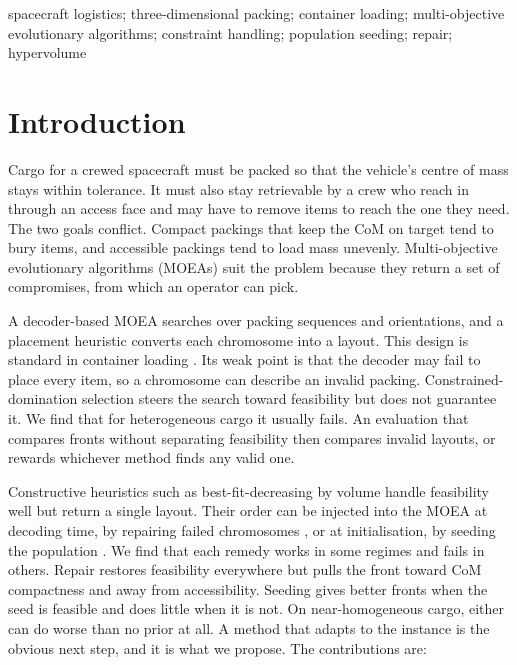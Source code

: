 \documentclass[journal]{IEEEtran}
\begin{document}
\begin{IEEEkeywords}
spacecraft logistics; three-dimensional packing; container loading; multi-objective evolutionary algorithms; constraint handling; population seeding; repair; hypervolume
\end{IEEEkeywords}

\section{Introduction}\label{sec:1}

Cargo for a crewed spacecraft must be packed so that the vehicle's centre of mass stays within tolerance. It must also stay retrievable by a crew who reach in through an access face and may have to remove items to reach the one they need. The two goals conflict. Compact packings that keep the CoM on target tend to bury items, and accessible packings tend to load mass unevenly. Multi-objective evolutionary algorithms (MOEAs) suit the problem because they return a set of compromises, from which an operator can pick.

A decoder-based MOEA searches over packing sequences and orientations, and a placement heuristic converts each chromosome into a layout. This design is standard in container loading \cite{goncalves2013}. Its weak point is that the decoder may fail to place every item, so a chromosome can describe an invalid packing. Constrained-domination selection \cite{deb2000,deb2002} steers the search toward feasibility but does not guarantee it. We find that for heterogeneous cargo it usually fails. An evaluation that compares fronts without separating feasibility then compares invalid layouts, or rewards whichever method finds any valid one.

Constructive heuristics such as best-fit-decreasing by volume handle feasibility well but return a single layout. Their order can be injected into the MOEA at decoding time, by repairing failed chromosomes \cite{salcedo2009}, or at initialisation, by seeding the population \cite{friedrich2015}. We find that each remedy works in some regimes and fails in others. Repair restores feasibility everywhere but pulls the front toward CoM compactness and away from accessibility. Seeding gives better fronts when the seed is feasible and does little when it is not. On near-homogeneous cargo, either can do worse than no prior at all. A method that adapts to the instance is the obvious next step, and it is what we propose. The contributions are:
\end{document}
